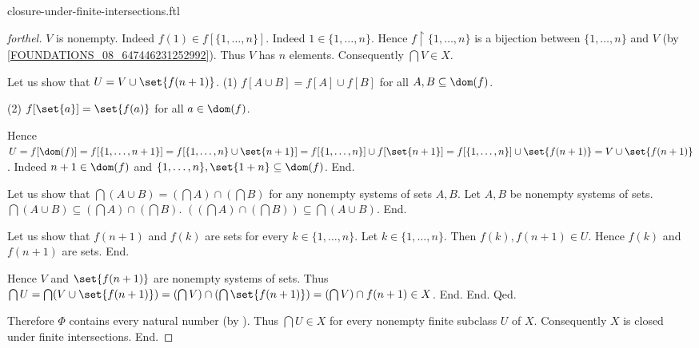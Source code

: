 \documentclass{naproche-library}
\begin{document}
\begin{smodule}[title=Closure Under Finite Intersections]{closure-under-finite-intersections.ftl}
\begin{proof}[forthel]
          $V$ is nonempty.
          Indeed $f(1) \in f[\{ 1, \dots, n \}]$.
          Indeed $1 \in \{ 1, \dots, n \}$.
          Hence $f \restriction \{ 1, \dots, n \}$ is a bijection between $\{ 1, \dots, n \}$ and $V$ (by \cref{FOUNDATIONS_08_647446231252992}).
          Thus $V$ has $n$ elements.
          Consequently $\bigcap V \in X$.

          Let us show that $U = V \cup \set{f(n + 1)}$. \newline
            (1) $f[A \cup B] = f[A] \cup f[B]$ for all $A, B \subseteq \dom(f)$.

            (2) $f[\set{a}] = \set{f(a)}$ for all $a \in \dom(f)$.

            Hence $U
              = f[\dom(f)]
              = f[\{ 1, \dots, n + 1 \}]
              = f[\{ 1, \dots, n \} \cup \set{n + 1}]
              = f[\{ 1, \dots, n \}] \cup f[\set{n + 1}]
              = f[\{ 1, \dots, n \}] \cup \set{f(n + 1)}
              = V \cup \set{f(n + 1)}$.
            Indeed $n + 1 \in \dom(f)$ and $\{ 1, \dots, n \}, \set{1 + n} \subseteq \dom(f)$.
          End.

          Let us show that $\bigcap (A \cup B) = (\bigcap A) \cap (\bigcap B)$ for any nonempty systems of sets $A, B$.
            Let $A, B$ be nonempty systems of sets.
            $\bigcap (A \cup B) \subseteq (\bigcap A) \cap (\bigcap B)$.
            $((\bigcap A) \cap (\bigcap B)) \subseteq \bigcap (A \cup B)$. %
          End.

          Let us show that $f(n + 1)$ and $f(k)$ are sets for every $k \in \{ 1, \dots, n \}$.
            Let $k \in \{ 1, \dots, n \}$.
            Then $f(k), f(n + 1) \in U$.
            Hence $f(k)$ and $f(n + 1)$ are sets.
          End.

          Hence $V$ and $\set{f(n + 1)}$ are nonempty systems of sets.
          Thus $\bigcap U
            = \bigcap (V \cup \set{f(n + 1)})
            = (\bigcap V) \cap (\bigcap \set{f(n + 1)})
            = (\bigcap V) \cap f(n + 1)
            \in X$.
        End.
      End.
    Qed.

    Therefore $\Phi$ contains every natural number (by ).
    Thus $\bigcap U \in X$ for every nonempty finite subclass $U$ of $X$.
    Consequently $X$ is closed under finite intersections.
  End.
\end{proof}
\end{smodule}
\end{document}
